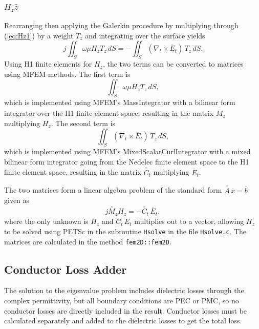 \documentclass[titlepage]{article}
\renewcommand\_{\textunderscore\linebreak[1]}
\begin{document}
\subsubsection{$H_z\hat{z}$}

Rearranging then applying the Galerkin procedure by multiplying through (\ref{eq:Hz1}) by a weight $T_z$ and integrating over the surface yields
\begin{equation}
j\iint_S \omega\mu H_z T_z\,dS=-\iint_S (\nabla_t \times\overline{E}_t)\, T_z\,dS.
\end{equation}
Using H1 finite elements for $H_z$, the two terms can be converted to matrices using MFEM methods.  The first term is
\begin{equation}
\iint_S \omega\mu H_z T_z\,dS,
\end{equation}
which is implemented using MFEM's MassIntegrator with a bilinear form integrator over the H1 finite element space, resulting in the matrix $\overline{\overline{M}}_z$ multiplying $H_z$.  The second term is 
\begin{equation}
\iint_S (\nabla_t \times\overline{E}_t)\, T_z\,dS,
\end{equation}
which is implemented using MFEM's MixedScalarCurlIntegrator with a mixed bilinear form integrator going from the Nedelec finite element space to the H1 finite element space, resulting in the matrix $\overline{\overline{C}}_t$ multiplying $\overline{E}_t$.

The two matrices form a linear algebra problem of the standard form $\overline{\overline{A}}\,\overline{x}=\overline{b}$ given as
\begin{equation}
\label{eq:Hzlinearalgebra}
j\overline{\overline{M}}_z H_z = -\overline{\overline{C}}_t \, \overline{E}_t,
\end{equation}
where the only unknown is $H_z$ and $\overline{\overline{C}}_t \, \overline{E}_t$ multiplies out to a vector, allowing $H_z$ to be solved using PETSc in the subroutine \texttt{Hsolve} in the file \texttt{Hsolve.c}. The matrices are calculated in the method \texttt{fem2D::fem2D}.

\subsection{Conductor Loss Adder}

The solution to the eigenvalue problem includes dielectric losses through the complex permittivity, but all boundary conditions are PEC or PMC, so no conductor losses are directly included in the result.  Conductor losses must be calculated separately and added to the dielectric losses to get the total loss.
\end{document}
